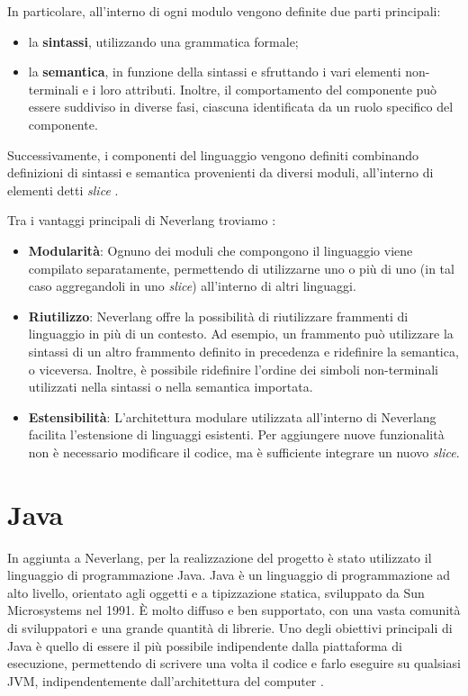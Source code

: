 \documentclass[12pt,a4paper,openright,twoside]{book}
\begin{document}
In particolare, all’interno di ogni modulo vengono definite due parti principali:
\begin{itemize}
    \item la \textbf{sintassi}, utilizzando una grammatica formale;
    \item la \textbf{semantica}, in funzione della sintassi e sfruttando i vari elementi non-terminali e i loro attributi. Inoltre, il 
    comportamento del componente può essere suddiviso in diverse fasi, ciascuna identificata da un ruolo specifico del componente.
\end{itemize}
Successivamente, i componenti del linguaggio vengono definiti combinando definizioni di sintassi e semantica provenienti da diversi moduli, 
all’interno di elementi detti \textit{slice} \cite{Vacchi2015}.

Tra i vantaggi principali di Neverlang troviamo \cite{Cazzola2012}:
\begin{itemize}
    \item \textbf{Modularità}: Ognuno dei moduli che compongono il linguaggio viene compilato separatamente, permettendo di utilizzarne uno o 
    più di uno (in tal caso aggregandoli in uno \textit{slice}) all’interno di altri linguaggi.
    \item \textbf{Riutilizzo}: Neverlang offre la possibilità di riutilizzare frammenti di linguaggio in più di un contesto. Ad esempio, un 
    frammento può utilizzare la sintassi di un altro frammento definito in precedenza e ridefinire la semantica, o viceversa. Inoltre, è 
    possibile ridefinire l’ordine dei simboli non-terminali utilizzati nella sintassi o nella semantica importata.
    \item \textbf{Estensibilità}: L’architettura modulare utilizzata all’interno di Neverlang facilita l’estensione di linguaggi esistenti. 
    Per aggiungere nuove funzionalità non è necessario modificare il codice, ma è sufficiente integrare un nuovo \textit{slice}.
\end{itemize}


\section{Java}
In aggiunta a Neverlang, per la realizzazione del progetto è stato utilizzato il linguaggio di programmazione Java. Java è un linguaggio di 
programmazione ad alto livello, orientato agli oggetti e a tipizzazione statica, sviluppato da Sun Microsystems nel 1991. È molto diffuso e 
ben supportato, con una vasta comunità di sviluppatori e una grande quantità di librerie. Uno degli obiettivi principali di Java è quello di 
essere il più possibile indipendente dalla piattaforma di esecuzione, permettendo di scrivere una volta il codice e farlo eseguire su qualsiasi 
\ac{JVM}, indipendentemente dall'architettura del computer \cite{IBMWebsite}.
\end{document}
